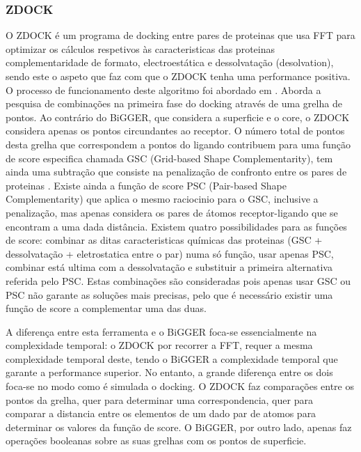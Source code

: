 \subsubsection{ZDOCK}
O ZDOCK é um programa de docking entre pares de proteinas que usa FFT para optimizar os cálculos respetivos às caracteristicas das proteinas complementaridade de formato, electroestática e dessolvatação (desolvation), sendo este o aspeto que faz com que o ZDOCK tenha uma performance positiva. O processo de funcionamento deste algoritmo foi abordado em \cite{zdock}.
Aborda a pesquisa de combinações na primeira fase do docking através de uma grelha de pontos. Ao contrário do BiGGER, que considera a superficie e o core, o ZDOCK considera apenas os pontos circundantes ao receptor. O número total de pontos desta grelha que correspondem a pontos do ligando contribuem para uma função de score especifica chamada GSC (Grid-based Shape Complementarity), tem ainda uma subtração que consiste na penalização de confronto entre os pares de proteinas \cite{chen2002docking}. Existe ainda a função de score PSC (Pair-based Shape Complementarity) que aplica o mesmo raciocinio para o GSC, inclusive a penalização, mas apenas considera os pares de átomos receptor-ligando que se encontram a uma dada distância.
Existem quatro possibilidades para as funções de score: combinar as ditas caracteristicas químicas das proteinas (GSC + dessolvatação + eletrostatica entre o par) numa só função, usar apenas PSC, combinar está ultima com a dessolvatação e substituir a primeira alternativa referida pelo PSC. Estas combinações são consideradas pois apenas usar GSC ou PSC não garante as soluções mais precisas, pelo que é necessário existir uma função de score a complementar uma das duas. \par
A diferença entre esta ferramenta e o BiGGER foca-se essencialmente na complexidade temporal: o ZDOCK por recorrer a FFT, requer a mesma complexidade temporal deste, tendo o BiGGER a complexidade temporal que garante a performance superior.
No entanto, a grande diferença entre os dois foca-se no modo como é simulada o docking. O ZDOCK faz comparações entre os pontos da grelha, quer para determinar uma correspondencia, quer para comparar a distancia entre os elementos de um dado par de atomos  para determinar os valores da função de score. O BiGGER, por outro lado, apenas faz operações booleanas sobre as suas grelhas com os pontos de superficie.  

